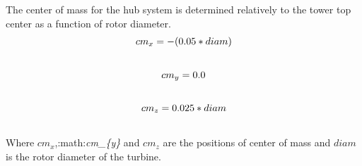 \documentclass[letterpaper,10pt,openany,oneside]{sphinxmanual}
\begin{document}
The center of mass for the hub system is determined relatively to the tower top center as a function of rotor diameter.
\begin{gather}
\begin{split}cm_{x} = -(0.05 * diam)\end{split}\notag\\\begin{split}\end{split}\notag
\end{gather}\begin{gather}
\begin{split}cm_{y} = 0.0\end{split}\notag\\\begin{split}\end{split}\notag
\end{gather}\begin{gather}
\begin{split}cm_{z} = 0.025 * diam\end{split}\notag\\\begin{split}\end{split}\notag
\end{gather}
Where $cm_{x}$,:math:\emph{cm\_\{y\}} and $cm_{z}$ are the positions of center of mass and $diam$ is the rotor diameter of the turbine.
\end{document}
